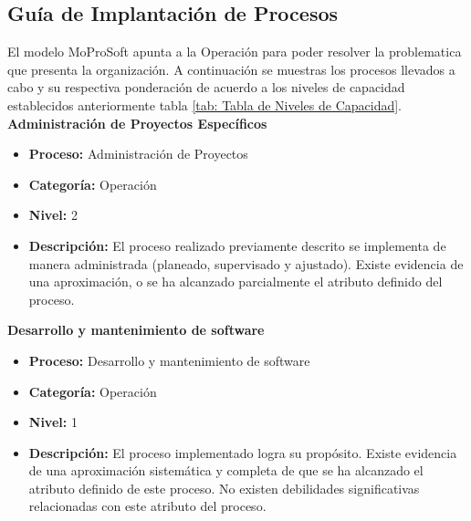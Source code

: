 \subsection{Guía de Implantación de Procesos}
El modelo MoProSoft apunta a la Operación para poder resolver la problematica que presenta la organización. A continuación se muestras los procesos llevados a cabo y su respectiva ponderación de acuerdo a los niveles de capacidad establecidos anteriormente tabla \ref{tab: Tabla de Niveles de Capacidad}. \\
\textbf{Administración de Proyectos Específicos}
\begin{itemize}
	\item \textbf{Proceso:} Administración de Proyectos
	\item \textbf{Categoría:} Operación
	\item \textbf{Nivel: }2
	\item \textbf{Descripción: }El proceso realizado previamente descrito se implementa de manera administrada (planeado, supervisado y ajustado). Existe evidencia de una aproximación, o se ha alcanzado parcialmente el atributo definido del proceso. 
\end{itemize}

\textbf{Desarrollo y mantenimiento de software}
\begin{itemize}
	\item \textbf{Proceso:} Desarrollo y mantenimiento de software
	\item \textbf{Categoría:} Operación
	\item \textbf{Nivel: }1
	\item \textbf{Descripción: } El proceso implementado logra su propósito. Existe evidencia de una aproximación sistemática y completa de que se ha alcanzado el atributo definido de este proceso. No existen debilidades significativas relacionadas con este atributo del proceso.
\end{itemize}

